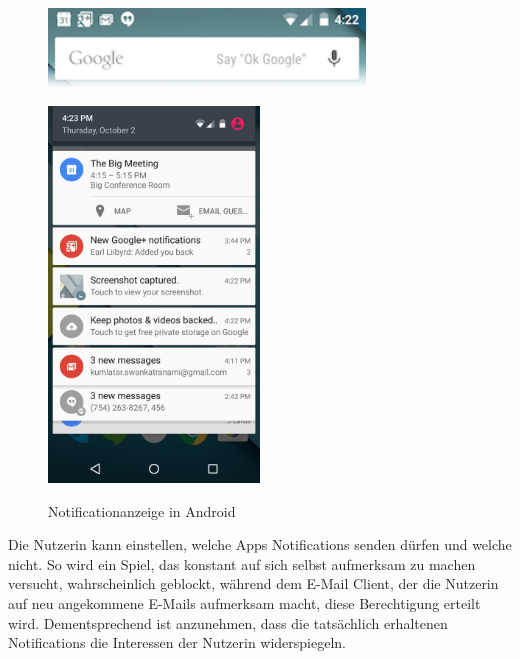 \begin{figure}%
\begin{minipage}{\textwidth}
\centering
  \includegraphics[width=0.75\textwidth]{images/notification_area.png}
  \label{fig:notificationarea}
\end{minipage}
\vfill
\begin{minipage}{\textwidth}
\centering
  \includegraphics[width=0.5\textwidth]{images/notification_drawer.png}
  \label{fig:notificationdrawer}
\end{minipage}
\vspace{-2mm}
\caption{Notificationanzeige in Android}
\label{fig:notAndroid}
\end{figure}

Die Nutzerin kann einstellen, welche Apps Notifications senden dürfen und welche nicht.
So wird ein Spiel, das konstant auf sich selbst aufmerksam zu machen versucht, wahrscheinlich geblockt,
während dem E-Mail Client, der die Nutzerin auf neu angekommene E-Mails aufmerksam macht, diese Berechtigung erteilt wird.
Dementsprechend ist anzunehmen, dass die tatsächlich erhaltenen Notifications die Interessen der Nutzerin widerspiegeln.
\par

